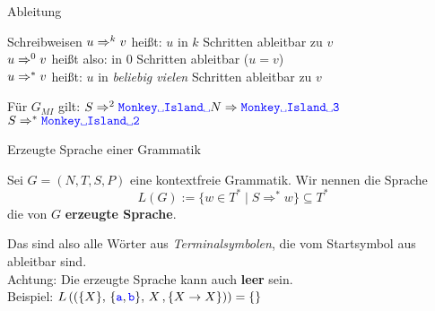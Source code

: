 \begin{frame}{Ableitung}	
	\begin{block}{Schreibweisen}
		$u \Rightarrow^k v$ \quad heißt: $u$ in $k$ Schritten ableitbar zu $v$ \\
		$u \Rightarrow^0 v$ \quad heißt also: in 0 Schritten ableitbar ($u=v$) \\
		\smallskip
		$u \Rightarrow^* v$ \quad heißt: $u$ in \emph{beliebig vielen} Schritten ableitbar zu $v$
	\end{block}
	
	
	\pause
	\begin{Beispiel}
		Für $G_{MI}$ gilt: $S \derives^2 \word{Monkey\sp Island\sp}N \derives \word{Monkey\sp Island\sp3}$\\
		$S \derives^* \word{Monkey\sp Island\sp2}$
	\end{Beispiel}
\end{frame}


\begin{frame}{Erzeugte Sprache einer Grammatik}
	\begin{Definition}
		Sei $G = (N, T, S, P)$ eine kontextfreie Grammatik. Wir nennen die Sprache $$L(G) := \{w \in T^\ast \mid S \Rightarrow^\ast w \} \subseteq T^*$$ die von $G$ \textbf{erzeugte Sprache}.
	\end{Definition} \pause
	Das sind also alle Wörter aus \emph{Terminalsymbolen}, die vom Startsymbol aus ableitbar sind.\\
	\bigskip
	Achtung: Die erzeugte Sprache kann auch \textbf{leer} sein. \\
	Beispiel: \pause $L\left(\left(\{X\},\, \{\hbox{\textcolor{blue}{\texttt{a}}}, \hbox{\textcolor{blue}{\texttt{b}}}\},\, X\, ,\{X\to X\}\right)\right) = \{\}$
\end{frame}

